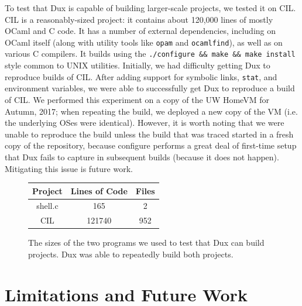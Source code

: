 \documentclass[10pt,conference]{IEEEtran}
\begin{document}
To test that Dux is capable of building larger-scale projects, we tested it on CIL. CIL is a reasonably-sized
project: it contains about 120,000 lines of mostly OCaml and C code. It has a number of external dependencies,
including on OCaml itself (along with utility tools like \texttt{opam} and \texttt{ocamlfind}), as well as on
various C compilers. It builds using the \texttt{./configure \&\& make \&\& make install} style common to UNIX
utilities. Initially, we had difficulty getting Dux to reproduce builds of CIL. After adding support for symbolic
links, \texttt{stat}, and environment variables, we were able to successfully get Dux to reproduce a build of CIL.
We performed this experiment on a copy of the UW HomeVM for Autumn, 2017; when repeating the build, we deployed
a new copy of the VM (i.e. the underlying OSes were identical). However, it is worth noting that we were unable
to reproduce the build unless the build that was traced started in a fresh copy of the repository, because
configure performs a great deal of first-time setup that Dux fails to capture in subsequent builds (because it
does not happen). Mitigating this issue is future work.

\begin{figure}
\begin{center}
\begin{tabular}{ |c|c|c| }
 \hline
 Project & Lines of Code & Files \\ \hline \hline
 shell.c & 165 & 2 \\ \hline
 CIL & 121740 & 952 \\
 \hline
\end{tabular}
\end{center}
\caption{The sizes of the two programs we used to test that Dux can build projects. Dux was able to repeatedly
build both projects.}
\end{figure}

\section{Limitations and Future Work}
\end{document}

